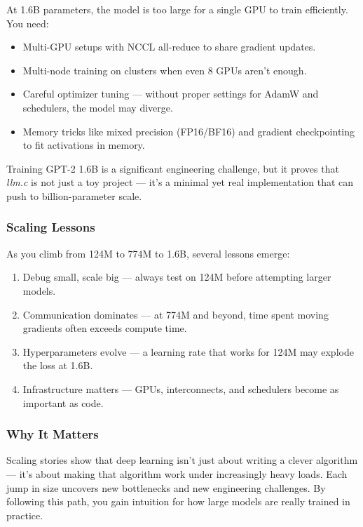 \documentclass[
  letterpaper,
  DIV=11,
  numbers=noendperiod]{scrreprt}
\providecommand{\tightlist}{%
  \setlength{\itemsep}{0pt}\setlength{\parskip}{0pt}}
\begin{document}
At 1.6B parameters, the model is too large for a single GPU to train
efficiently. You need:

\begin{itemize}
\tightlist
\item
  Multi-GPU setups with NCCL all-reduce to share gradient updates.
\item
  Multi-node training on clusters when even 8 GPUs aren't enough.
\item
  Careful optimizer tuning --- without proper settings for AdamW and
  schedulers, the model may diverge.
\item
  Memory tricks like mixed precision (FP16/BF16) and gradient
  checkpointing to fit activations in memory.
\end{itemize}

Training GPT-2 1.6B is a significant engineering challenge, but it
proves that \emph{llm.c} is not just a toy project --- it's a minimal
yet real implementation that can push to billion-parameter scale.

\subsubsection{Scaling Lessons}\label{scaling-lessons}

As you climb from 124M to 774M to 1.6B, several lessons emerge:

\begin{enumerate}
\def\labelenumi{\arabic{enumi}.}
\tightlist
\item
  Debug small, scale big --- always test on 124M before attempting
  larger models.
\item
  Communication dominates --- at 774M and beyond, time spent moving
  gradients often exceeds compute time.
\item
  Hyperparameters evolve --- a learning rate that works for 124M may
  explode the loss at 1.6B.
\item
  Infrastructure matters --- GPUs, interconnects, and schedulers become
  as important as code.
\end{enumerate}

\subsubsection{Why It Matters}\label{why-it-matters-52}

Scaling stories show that deep learning isn't just about writing a
clever algorithm --- it's about making that algorithm work under
increasingly heavy loads. Each jump in size uncovers new bottlenecks and
new engineering challenges. By following this path, you gain intuition
for how large models are really trained in practice.
\end{document}
